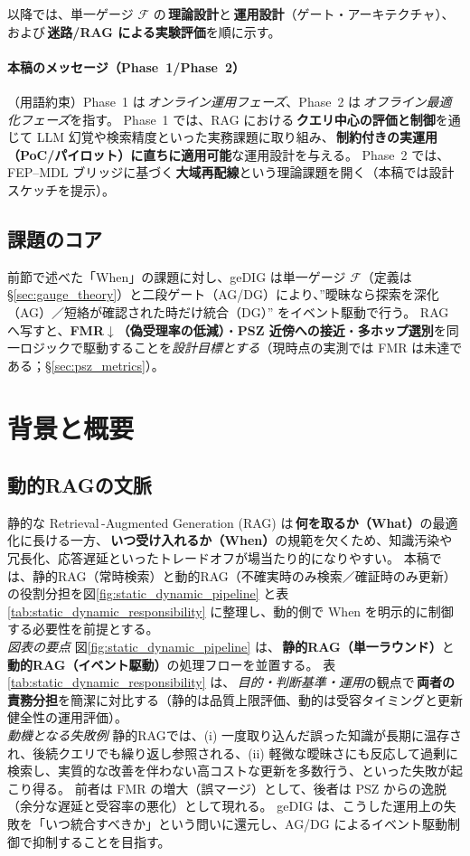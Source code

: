 \documentclass[ja=standard,xelatex]{bxjsarticle}
\newcommand{\F}{\mathcal{F}}
\begin{document}
以降では、単一ゲージ $\F$ の\,\textbf{理論設計}と\,\textbf{運用設計}（ゲート・アーキテクチャ）、および\,\textbf{迷路/RAG による実験評価}を順に示す。

\paragraph{本稿のメッセージ（Phase~1/Phase~2）}
（用語約束）Phase~1 は\,\emph{オンライン運用フェーズ}、Phase~2 は\,\emph{オフライン最適化フェーズ}を指す。
Phase~1 では、RAG における\,\textbf{クエリ中心の評価と制御}を通じて LLM 幻覚や検索精度といった実務課題に取り組み、\,\textbf{制約付きの実運用（PoC/パイロット）に直ちに適用可能}な運用設計を与える。
Phase~2 では、FEP–MDL ブリッジに基づく\,\textbf{大域再配線}という理論課題を開く（本稿では設計スケッチを提示）。

\subsection{課題のコア}\label{sec:intro_core}
前節で述べた「When」の課題に対し、geDIG は単一ゲージ $\F$（定義は §\ref{sec:gauge_theory}）と二段ゲート（AG/DG）により、”曖昧なら探索を深化（AG）／短絡が確認された時だけ統合（DG）” をイベント駆動で行う。
RAG へ写すと、\textbf{FMR$\downarrow$（偽受理率の低減）}・\textbf{PSZ 近傍への接近}・\textbf{多ホップ選別}を同一ロジックで駆動することを\emph{設計目標とする}（現時点の実測では FMR は未達である；\S\ref{sec:psz_metrics}）。

\section{背景と概要}\label{sec:background_overview}

\subsection{動的RAGの文脈}
静的な Retrieval\,\mbox{-}Augmented Generation (RAG) は\,\textbf{何を取るか（What）}の最適化に長ける一方、\,\textbf{いつ受け入れるか（When）}の規範を欠くため、知識汚染や冗長化、応答遅延といったトレードオフが場当たり的になりやすい。
本稿では、静的RAG（常時検索）と動的RAG（不確実時のみ検索／確証時のみ更新）の役割分担を図\ref{fig:static_dynamic_pipeline} と表\ref{tab:static_dynamic_responsibility} に整理し、動的側で When を明示的に制御する必要性を前提とする。
\\
\noindent\textit{図表の要点}\; 図\ref{fig:static_dynamic_pipeline} は、\,\textbf{静的RAG（単一ラウンド）}と\,\textbf{動的RAG（イベント駆動）}の処理フローを並置する。
表\ref{tab:static_dynamic_responsibility} は、\,\emph{目的・判断基準・運用}の観点で\,\textbf{両者の責務分担}を簡潔に対比する（静的は品質上限評価、動的は受容タイミングと更新健全性の運用評価）。
\\
\noindent\textit{動機となる失敗例}\; 静的RAGでは、(i) 一度取り込んだ誤った知識が長期に温存され、後続クエリでも繰り返し参照される、(ii) 軽微な曖昧さにも反応して過剰に検索し、実質的な改善を伴わない高コストな更新を多数行う、といった失敗が起こり得る。
前者は FMR の増大（誤マージ）として、後者は PSZ からの逸脱（余分な遅延と受容率の悪化）として現れる。
geDIG は、こうした運用上の失敗を「いつ統合すべきか」という問いに還元し、AG/DG によるイベント駆動制御で抑制することを目指す。
\end{document}

